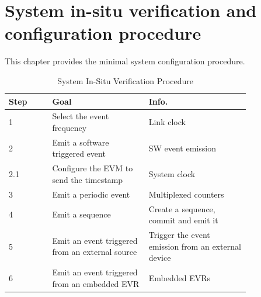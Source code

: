 \documentclass[11pt
  , a4paper
  , article
  , oneside
  , showtrims
]{memoir}
\begin{document}
\chapter{System in-situ verification and configuration procedure}
This chapter provides the minimal system configuration procedure.
\begin{table}[!htb]
  \centering
  \begin{tabular}{l|p{0.4\linewidth}|p{0.42\linewidth}}
    \toprule
    Step & Goal                                            & Info.                                              \\\midrule
    1    & Select the event frequency                      & Link clock                                         \\\midrule
    2    & Emit a software triggered event                 & SW event emission                                  \\\midrule
    2.1  & Configure the EVM to send the timestamp         & System clock                                       \\\midrule
    3    & Emit a periodic event                           & Multiplexed counters                               \\\midrule
    4    & Emit a sequence                                 & Create a sequence, commit and emit it              \\\midrule
    5    & Emit an event triggered from an external source & Trigger the event emission from an external device \\\midrule
    6    & Emit an event triggered from an embedded EVR    & Embedded EVRs                                      \\\bottomrule
  \end{tabular}
  \caption[]{System In-Situ Verification Procedure}
  \label{table:checklist}
\end{table}
\end{document}
